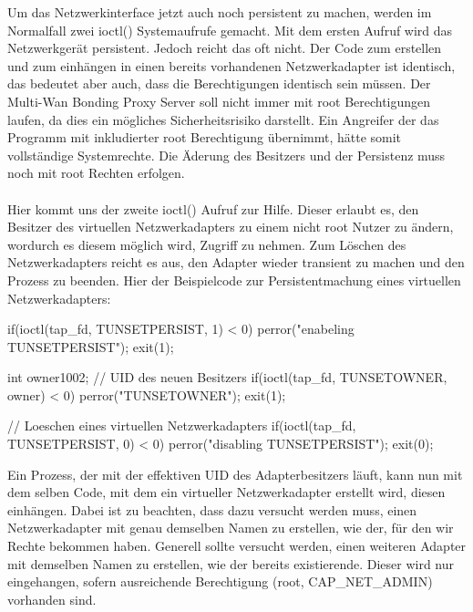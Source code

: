 Um das Netzwerkinterface jetzt auch noch persistent zu machen, werden im Normalfall zwei ioctl() Systemaufrufe gemacht. Mit dem ersten Aufruf wird das Netzwerkgerät persistent. Jedoch reicht das oft nicht. Der Code zum erstellen und zum einhängen in einen bereits vorhandenen Netzwerkadapter ist identisch, das bedeutet aber auch, dass die Berechtigungen identisch sein müssen. Der Multi-Wan Bonding Proxy Server soll nicht immer mit root Berechtigungen laufen, da dies ein mögliches Sicherheitsrisiko darstellt. Ein Angreifer der das Programm mit inkludierter root Berechtigung übernimmt, hätte somit vollständige Systemrechte. Die Äderung des Besitzers und der Persistenz muss noch mit root Rechten erfolgen.
\\\\
Hier kommt uns der zweite ioctl() Aufruf zur Hilfe. Dieser erlaubt es, den Besitzer des virtuellen Netzwerkadapters zu einem nicht root Nutzer zu ändern, wordurch es diesem möglich wird, Zugriff zu nehmen. Zum Löschen des Netzwerkadapters reicht es aus, den Adapter wieder transient zu machen und den Prozess zu beenden. Hier der Beispielcode zur Persistentmachung eines virtuellen Netzwerkadapters:
\begin{program}[H]
    \begin{CppCode}
        if(ioctl(tap_fd, TUNSETPERSIST, 1) < 0){
            perror("enabeling TUNSETPERSIST");
            exit(1);
        }
        
        int owner{1002}; // UID des neuen Besitzers
        if(ioctl(tap_fd, TUNSETOWNER, owner) < 0){
            perror("TUNSETOWNER");
            exit(1);
        }

        // Loeschen eines virtuellen Netzwerkadapters
        if(ioctl(tap_fd, TUNSETPERSIST, 0) < 0){
            perror("disabling TUNSETPERSIST");
        }
        exit(0);
    \end{CppCode}
\end{program}
\noindent
Ein Prozess, der mit der effektiven UID des Adapterbesitzers läuft, kann nun mit dem selben Code, mit dem ein virtueller Netzwerkadapter erstellt wird, diesen einhängen. Dabei ist zu beachten, dass dazu versucht werden muss, einen Netzwerkadapter mit genau demselben Namen zu erstellen, wie der, für den wir Rechte bekommen haben. Generell sollte versucht werden, einen weiteren Adapter mit demselben Namen zu erstellen, wie der bereits existierende. Dieser wird nur eingehangen, sofern ausreichende Berechtigung (root, CAP\_NET\_ADMIN) vorhanden sind. 

\newpage
